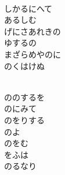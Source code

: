 \documentclass[10pt,b5j]{tarticle} %
\begin{document}
\vspace{1.5em} %
\newcommand{\linespace}{0.5em} %
\newcommand{\blocksize}{0.5\hsize} %
\newcommand{\itemmargin}{3em} %
\begin{enumerate} %
    \setlength{\itemindent}{\itemmargin} %
    \begin{minipage}[c]{\blocksize}
    
        \vspace{\linespace}
        \item~\\
        しかるにへて\\
        あるしむ\\
        げにさあれきの\\
        ゆするの\\
        まざらめやのに\\
        のくはけぬ
        
    \end{minipage}
    \begin{minipage}[c]{\blocksize}
        
        \vspace{\linespace}
        \item~\\
        ののするを\\
        のにみて\\
        のをりする\\
        のよ\\
        のをむ\\
        をふは\\
        のるなり
        
    \end{minipage}
    \begin{minipage}[c]{\blocksize}
        

\end{minipage}
\end{enumerate}
\end{document}
